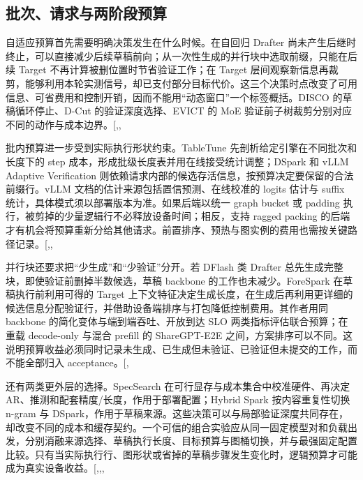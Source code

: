 \documentclass[
  a4paper,
  UTF8,
  fontset=none,
  zihao=5]{ctexart}
\begin{document}
\subsection{批次、请求与两阶段预算}\label{batch-budget}

自适应预算首先需要明确决策发生在什么时候。在自回归 Drafter
尚未产生后继时终止，可以直接减少后续草稿前向；从一次性生成的并行块中选取前缀，只能在后续
Target 不再计算被删位置时节省验证工作；在 Target
层间观察新信息再裁剪，能够利用本轮实测信号，却已支付部分目标代价。这三个决策时点改变了可用信息、可省费用和控制开销，因而不能用``动态窗口''一个标签概括。DISCO
的草稿循环停止、D-Cut 的验证深度选择、EVICT 的 MoE
验证前子树裁剪分别对应不同的动作与成本边界。{[},,\citeproc{ref-dcut}{59}{]}

批内预算进一步受到实际执行形状约束。TableTune
先剖析给定引擎在不同批次和长度下的 step
成本，形成批级长度表并用在线接受统计调整；DSpark 和 vLLM Adaptive
Verification
则依赖请求内部的候选存活信息，按预算决定要保留的合法前缀行。vLLM
文档的估计来源包括置信预测、在线校准的 logits 估计与 suffix
统计，具体模式须以部署版本为准。如果后端以统一 graph bucket 或 padding
执行，被剪掉的少量逻辑行不必释放设备时间；相反，支持 ragged packing
的后端才有机会将预算重新分给其他请求。前置排序、预热与图实例的费用也需按关键路径记录。{[},,\citeproc{ref-avdocs}{60}{]}

并行块还要求把``少生成''和``少验证''分开。若 DFlash 类 Drafter
总先生成完整块，即使验证前删掉半数候选，草稿 backbone
的工作也未减少。ForeSpark 在草稿执行前利用可得的 Target
上下文特征决定生成长度，在生成后再利用更详细的候选信息分配验证行，并借助设备端排序与打包降低控制费用。其作者用同
backbone 的简化变体与端到端吞吐、开放到达 SLO
两类指标评估联合预算；在重载 decode-only 与混合 prefill 的 ShareGPT-E2E
之间，方案排序可以不同。这说明预算收益必须同时记录未生成、已生成但未验证、已验证但未提交的工作，而不能全部归入
acceptance。{[},\citeproc{ref-forespark}{14}{]}

还有两类更外层的选择。SpecSearch 在可行显存与成本集合中校准硬件、再决定
AR、推测和配套精度/长度，作用于部署配置；Hybrid Spark 按内容重复性切换
n-gram 与
DSpark，作用于草稿来源。这些决策可以与局部验证深度共同存在，却改变不同的成本和缓存契约。一个可信的组合实验应从同一固定模型对和负载出发，分别消融来源选择、草稿执行长度、目标预算与图桶切换，并与最强固定配置比较。只有当实际执行行、图形状或省掉的草稿步骤发生变化时，逻辑预算才可能成为真实设备收益。{[},,,\citeproc{ref-hybridspark}{62}{]}
\end{document}
